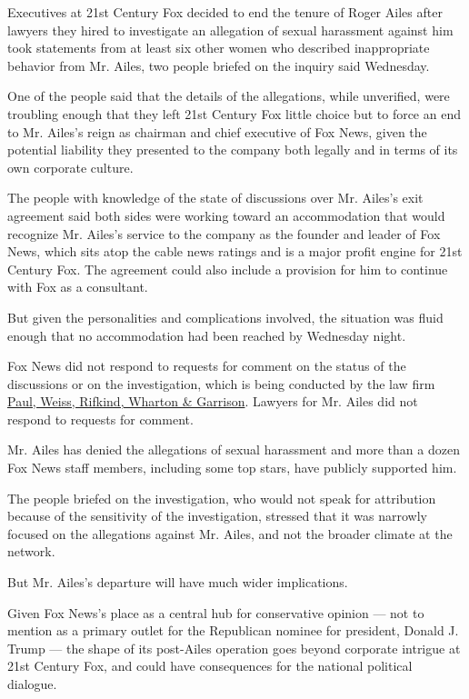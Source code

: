 Executives at 21st Century Fox decided to end the tenure of Roger Ailes
after lawyers they hired to investigate an allegation of sexual
harassment against him took statements from at least six other women who
described inappropriate behavior from Mr. Ailes, two people briefed on
the inquiry said Wednesday.

One of the people said that the details of the allegations, while
unverified, were troubling enough that they left 21st Century Fox little
choice but to force an end to Mr. Ailes's reign as chairman and chief
executive of Fox News, given the potential liability they presented to
the company both legally and in terms of its own corporate culture.

The people with knowledge of the state of discussions over Mr. Ailes's
exit agreement said both sides were working toward an accommodation that
would recognize Mr. Ailes's service to the company as the founder and
leader of Fox News, which sits atop the cable news ratings and is a
major profit engine for 21st Century Fox. The agreement could also
include a provision for him to continue with Fox as a consultant.

But given the personalities and complications involved, the situation
was fluid enough that no accommodation had been reached by Wednesday
night.

Fox News did not respond to requests for comment on the status of the
discussions or on the investigation, which is being conducted by the law
firm \href{http://www.paulweiss.com/}{Paul, Weiss, Rifkind, Wharton \&
Garrison}. Lawyers for Mr. Ailes did not respond to requests for
comment.

Mr. Ailes has denied the allegations of sexual harassment and more than
a dozen Fox News staff members, including some top stars, have publicly
supported him.

The people briefed on the investigation, who would not speak for
attribution because of the sensitivity of the investigation, stressed
that it was narrowly focused on the allegations against Mr. Ailes, and
not the broader climate at the network.

But Mr. Ailes's departure will have much wider implications.

Given Fox News's place as a central hub for conservative opinion --- not
to mention as a primary outlet for the Republican nominee for president,
Donald J. Trump --- the shape of its post-Ailes operation goes beyond
corporate intrigue at 21st Century Fox, and could have consequences for
the national political dialogue.

